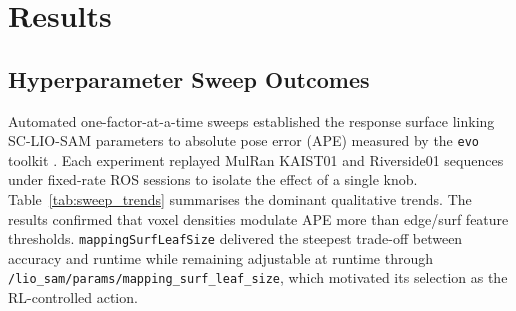 \chapter[Results]{Results}
\label{Chap:Results}



\section{Hyperparameter Sweep Outcomes}
Automated one-factor-at-a-time sweeps established the response surface linking SC-LIO-SAM parameters to absolute pose error (APE) measured by the \texttt{evo} toolkit \cite{grupp2017evo}. Each experiment replayed MulRan KAIST01 and Riverside01 sequences \cite{kim_2020_mulran} under fixed-rate ROS sessions to isolate the effect of a single knob. Table~\ref{tab:sweep_trends} summarises the dominant qualitative trends. The results confirmed that voxel densities modulate APE more than edge/surf feature thresholds. \texttt{mappingSurfLeafSize} delivered the steepest trade-off between accuracy and runtime while remaining adjustable at runtime through \texttt{/lio\_sam/params/mapping\_surf\_leaf\_size}, which motivated its selection as the RL-controlled action.

